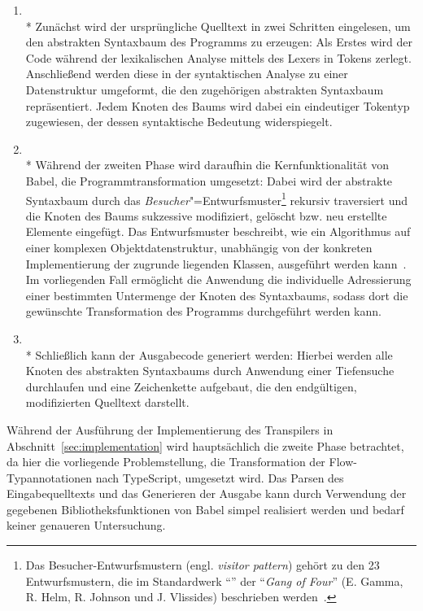 \begin{enumerate}
  \item {}\\*
    Zunächst wird der ursprüngliche Quelltext in zwei Schritten eingelesen, um den abstrakten Syntaxbaum des Programms zu erzeugen: Als Erstes wird der Code während der lexikalischen Analyse mittels des Lexers in Tokens zerlegt. Anschließend werden diese in der syntaktischen Analyse zu einer Datenstruktur umgeformt, die den zugehörigen abstrakten Syntaxbaum repräsentiert. Jedem Knoten des Baums wird dabei ein eindeutiger Tokentyp zugewiesen, der dessen syntaktische Bedeutung widerspiegelt.
    \bigbreak
  \item {}\\*
    Während der zweiten Phase wird daraufhin die Kernfunktionalität von Babel, die Programmtransformation umgesetzt: Dabei wird der abstrakte Syntaxbaum durch das \emph{Besucher}"=Entwurfsmuster\footnote{Das Besucher-Entwurfsmustern (engl. \textit{visitor pattern}) gehört zu den 23 Entwurfsmustern, die im Standardwerk \enquote{} der \enquote{\textit{Gang of Four}} (E. Gamma, R. Helm, R. Johnson und J. Vlissides) beschrieben werden~\autocite[306\psqq]{GAMMA:1994}.} rekursiv traversiert und die Knoten des Baums sukzessive modifiziert, gelöscht bzw. neu erstellte Elemente eingefügt. Das Entwurfsmuster beschreibt, wie ein Algorithmus auf einer komplexen Objektdatenstruktur, unabhängig von der konkreten Implementierung der zugrunde liegenden Klassen, ausgeführt werden kann~\autocite[634\psq]{FREEMAN:2004}. Im vorliegenden Fall ermöglicht die Anwendung die individuelle Adressierung einer bestimmten Untermenge der Knoten des Syntaxbaums, sodass dort die gewünschte Transformation des Programms durchgeführt werden kann.
    \bigbreak
  \item {}\\*
    Schließlich kann der Ausgabecode generiert werden: Hierbei werden alle Knoten des abstrakten Syntaxbaums durch Anwendung einer Tiefensuche durchlaufen und eine Zeichenkette aufgebaut, die den endgültigen, modifizierten Quelltext darstellt.
\end{enumerate}

Während der Ausführung der Implementierung des Transpilers in Abschnitt~\ref{sec:implementation} wird hauptsächlich die zweite Phase betrachtet, da hier die vorliegende Problemstellung, die Transformation der Flow-Typannotationen nach TypeScript, umgesetzt wird. Das Parsen des Eingabequelltexts und das Generieren der Ausgabe kann durch Verwendung der gegebenen Bibliotheksfunktionen von Babel simpel realisiert werden und bedarf keiner genaueren Untersuchung.

